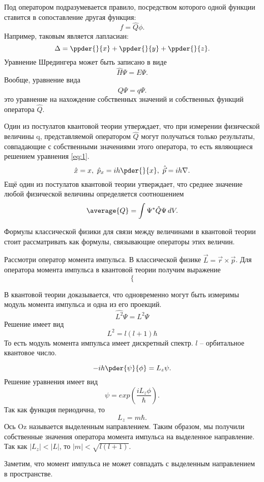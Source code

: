 
Под оператором подразумевается правило, посредством которого одной функции
ставится в сопоставление другая функция:
\[
    f = \hat{Q}\phi.
\]
Например, таковым является лапласиан:
\[
    \Delta = \ppder{}{x} + \ppder{}{y} + \ppder{}{z}.
\]
Уравнение Шредингера может быть записано в виде
\[
    \hat{H}\Psi = E\Psi.
\]
Вообще, уравнение вида
\begin{equation}
    \hat{Q}\Psi = q\Psi.
    \label{eq:1}    
\end{equation}
это уравнение на нахождение собственных значений и собственных функций оператора
\( \hat{Q} \).

Один из постулатов квантовой теории утверждает, что при измерении физической
величины q, представляемой оператором  \( \hat{Q} \) могут получаться только
результаты, совпадающие с собственными значениями этого оператора, то есть
являющиеся решением уравнения \ref{eq:1}.
\[
    \hat{x} = x,\ \hat{p}_x = ih\pder{}{x},\ \hat{\vec{p}} = ih\nabla. 
\]
Ещё один из постулатов квантовой теории утверждает, что среднее значение любой
физической величины определяется соотношением
\[
    \average{Q} = \int \Psi^*\hat{Q}\Psi\,dV.
\]

Формулы классической физики для связи между величинами в квантовой теории стоит
рассматривать как формулы, связывающие операторы этих величин.

Рассмотри оператор момента импульса. В классической физике
\( \vec{L} = \vec{r}\times\vec{p} \). Для оператора момента импульса в квантовой
теории получим выражение
\[
    \left\{\right.
\]

В квантовой теории доказывается, что одновременно могут быть измеримы модуль
момента импульса и одна из его проекций.
\[
    \hat{L^2}\Psi = L^2\Psi
\]
Решение имеет вид
\[
    L^2 = l(l+1)\hbar
\]
То есть модуль момента импульса имеет дискретный спектр. \( l \) -- орбитальное
квантовое число.

\[
    -ih\pder{\psi}{\phi} = L_z\psi.
\]
Решение уравнения имеет вид
\[
    \psi = exp(\frac{iL_z\phi}{\hbar}).
\]
Так как функция периодична, то
\[
    L_z = m\hbar.
\]
Ось Oz  называется выделенным направлением. Таким образом, мы получили
собственные значения оператора момента импульса на выделенное направление.
Так как \( |L_z| < |L| \), то \( |m| < \sqrt{l(l+1)} \).

Заметим, что момент импульса не может совпадать с выделенным направлением в
пространстве.

\newpage
